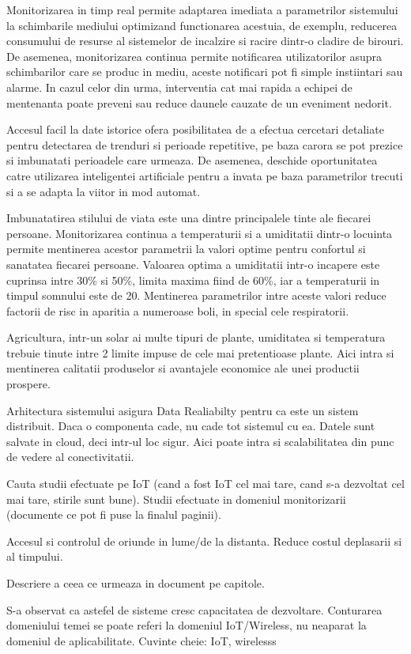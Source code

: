Monitorizarea in timp real permite adaptarea imediata a parametrilor sistemului la schimbarile mediului optimizand functionarea acestuia, de exemplu,
reducerea consumului de resurse al sistemelor de incalzire si racire dintr-o cladire de birouri. De asemenea, monitorizarea continua permite notificarea 
utilizatorilor asupra schimbarilor care se produc in mediu, aceste notificari pot fi simple instiintari sau alarme. In cazul celor din urma, interventia 
cat mai rapida a echipei de mentenanta poate preveni sau reduce daunele cauzate de un eveniment nedorit.

Accesul facil la date istorice ofera posibilitatea de a efectua cercetari detaliate pentru detectarea de trenduri si perioade repetitive, pe baza
carora se pot prezice si imbunatati perioadele care urmeaza. De asemenea, deschide oportunitatea catre utilizarea inteligentei artificiale pentru 
a invata pe baza parametrilor trecuti si a se adapta la viitor in mod automat.

Imbunatatirea stilului de viata este una dintre principalele tinte ale fiecarei persoane. Monitorizarea continua a temperaturii si a umiditatii 
dintr-o locuinta permite mentinerea acestor parametrii la valori optime pentru confortul si sanatatea fiecarei persoane. Valoarea optima a umiditatii 
intr-o incapere este cuprinsa intre 30\% si 50\%, limita maxima fiind de 60\%, iar a temperaturii in timpul 
somnului este de 20.
Mentinerea parametrilor intre aceste valori reduce factorii de risc in aparitia a numeroase boli, in special cele respiratorii.

Agricultura, intr-un solar ai multe tipuri de plante, umiditatea si temperatura trebuie tinute intre 2 limite impuse de cele mai pretentioase plante. Aici
intra si mentinerea calitatii produselor si avantajele economice ale unei productii prospere.

Arhitectura sistemului asigura Data Realiabilty pentru ca este un sistem distribuit. Daca o componenta cade, nu cade tot sistemul cu ea. Datele sunt
salvate in cloud, deci intr-ul loc sigur. Aici poate intra si scalabilitatea din punc de vedere al conectivitatii.

Cauta studii efectuate pe IoT (cand a fost IoT cel mai tare, cand s-a dezvoltat cel mai tare, stirile sunt bune). Studii efectuate in 
domeniul monitorizarii (documente ce pot fi puse la finalul paginii).

Accesul si controlul de oriunde in lume/de la distanta. Reduce costul deplasarii si al timpului.

Descriere a ceea ce urmeaza in document pe capitole.

S-a observat ca astefel de sisteme cresc capacitatea de dezvoltare.
Conturarea domeniului temei se poate referi la domeniul IoT/Wireless, nu neaparat la domeniul de aplicabilitate.
Cuvinte cheie: IoT, wirelesss

